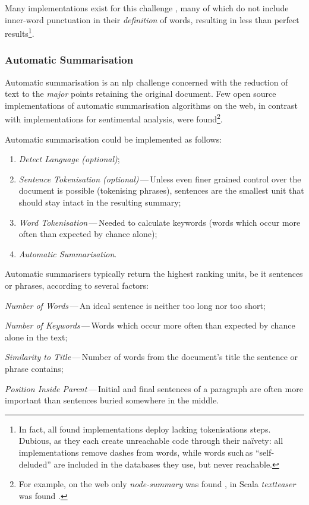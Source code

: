 Many implementations exist for this challenge
  \autocites{thinkroth/sentimental-source-code}{mileszim/sediment-source-code}
  {thisandagain/sentiment-source-code}, many of which do not include
  inner-word punctuation in their \emph{definition} of words, resulting in
  less than perfect results\footnote{In fact, all found implementations
      deploy lacking tokenisations steps.
    Dubious, as they each create unreachable code through their na\"ivety:
      all implementations remove dashes from words, while words such\,as
      ``self-deluded'' are included in the databases they use, but never
      reachable.}.

\subsubsection{Automatic Summarisation}\label{automatic-summarisation}

Automatic summarisation is an \gls{nlp} challenge concerned with the reduction
  of text to the \emph{major} points retaining the original document.
Few open source implementations of automatic summarisation algorithms on
  the web, in contrast with implementations for sentimental analysis, were
  found\footnote{For example, on the web only \emph{node-summary} was found
    \autocite{jbrooksuk/node-summary-source-code}, in Scala \emph{textteaser}
    was found \autocite{MojoJolo/textteaser-source-code}.}.

Automatic summarisation could be implemented as follows:

\begin{enumerate}
\item\emph{Detect Language (optional)};
\item\emph{Sentence Tokenisation (optional)}\,---\,Unless even finer grained
  control over the document is possible (tokenising phrases), sentences are
  the smallest unit that should stay intact in the resulting summary;
\item\emph{Word Tokenisation}\,---\,Needed to calculate keywords (words
  which occur more often than expected by chance alone);
\item\emph{Automatic Summarisation}.
\end{enumerate}

\noindent Automatic summarisers typically return the highest ranking units,
  be it sentences or phrases, according to several factors:

\begin{aenumerate}
\item\emph{Number of Words}\,---\,An ideal sentence is neither too long nor
  too short;
\item\emph{Number of Keywords}\,---\,Words which occur more often than
  expected by chance alone in the text;
\item\emph{Similarity to Title}\,---\,Number of words from the document's
  title the sentence or phrase contains;
\item\emph{Position Inside Parent}\,---\,Initial and final sentences of a
  paragraph are often more important than sentences buried somewhere in
  the middle.
\end{aenumerate}

